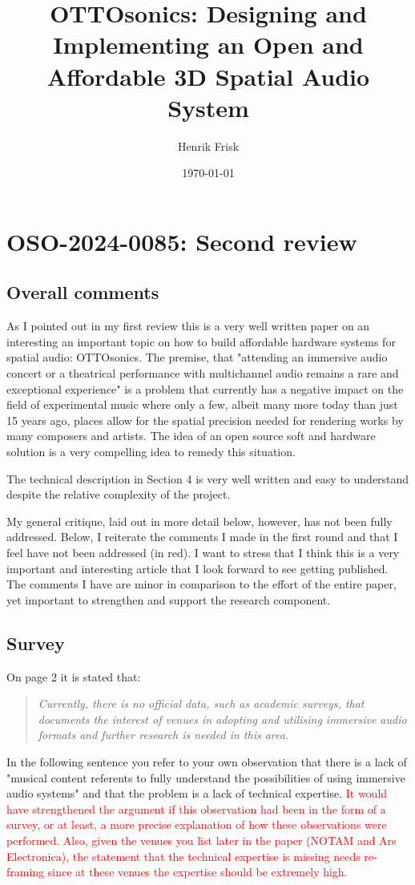 \documentclass[11pt]{article}
\author{Henrik Frisk}
\date{\today}
\title{OTTOsonics: Designing and Implementing an Open and Affordable 3D Spatial Audio System}
\begin{document}
\maketitle
\renewcommand\familydefault{\sfdefault}
\section*{OSO-2024-0085: Second review}
\label{sec:org811e95b}
\subsection*{Overall comments}
\label{sec:org2cf6c4a}

As I pointed out in my first review this is a very well written paper on an interesting an important topic on how to build affordable hardware systems for spatial audio: OTTOsonics. The premise, that "attending an immersive audio concert or a theatrical performance with multichannel audio remains a rare and exceptional experience" is a problem that currently has a negative impact on the field of experimental music where only a few, albeit many more today than just 15 years ago, places allow for the spatial precision needed for rendering works by many composers and artists. The idea of an open source soft and hardware solution is a very compelling idea to remedy this situation.

The technical description in Section 4 is very well written and easy to understand despite the relative complexity of the project.

My general critique, laid out in more detail below, however, has not been fully addressed. Below, I reiterate the comments I made in the first round and that I feel have not been addressed (in red). I want to stress that I think this is a very important and interesting article that I look forward to see getting published. The comments I have are minor in comparison to the effort of the entire paper, yet important to strengthen and support the research component.
\subsection*{Survey}
\label{sec:orgbf605c1}
On page 2 it is stated that:

\begin{quote}
\emph{Currently, there is no official data, such as academic surveys, that documents the interest of
venues in adopting and utilising immersive audio formats and further research is needed in
this area.}
\end{quote}
In the following sentence you refer to your own observation that there is a lack of "musical content referents to fully understand the possibilities of using immersive audio systems" and that the problem is a lack of technical expertise. \textcolor{red}{It would have strengthened the argument if this observation had been in the form of a survey, or at least, a more precise explanation of how these observations were performed. Also, given the venues you list later in the paper (NOTAM and Ars Electronica), the statement that the technical expertise is missing needs re-framing since at these venues the expertise should be extremely high.}
\end{document}
